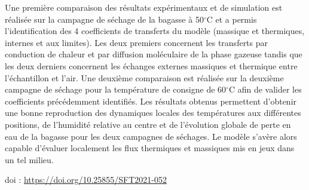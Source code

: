 {Une première comparaison des résultats expérimentaux et de simulation est réalisée sur la campagne de séchage de la bagasse à 50$^{\circ}$C et a permis l'identification des 4 coefficients de transferts du modèle (massique et thermiques, internes et aux limites). Les deux premiers concernent les transferts par conduction de chaleur et par diffusion moléculaire de la phase gazeuse tandis que les deux derniers concernent les échanges externes massiques et thermique entre l'échantillon et l'air. Une deuxième comparaison est réalisée sur la deuxième campagne de séchage pour la température de consigne de 60$^{\circ}$C afin de valider les coefficients précédemment identifiés. Les résultats obtenus permettent d'obtenir une bonne reproduction des dynamiques locales des températures aux différentes positions, de l'humidité relative au centre et de l'évolution globale de perte en eau de la bagasse pour les deux campagnes de séchages. Le modèle s'avère alors capable d'évaluer localement les flux thermiques et massiques mis en jeux dans un tel milieu.

 \vfill doi : \url{https://doi.org/10.25855/SFT2021-052}

}
 
